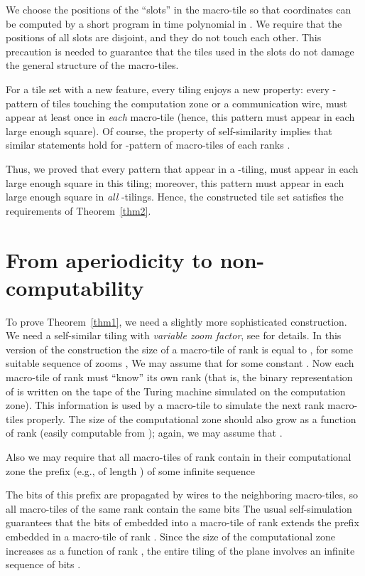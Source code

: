 \documentclass[runningheads]{llncs}
\begin{document}
We choose the positions of the ``slots'' in the macro-tile so that coordinates can be computed by a short program in time polynomial in . We require that the positions of all slots are disjoint, and they do not touch each other. This precaution is needed to guarantee that the tiles used in the slots do not damage the general structure of the macro-tiles.

For a tile set with a new feature, every tiling enjoys a new property: every -pattern of tiles touching the computation zone or a communication wire, must appear at least once in \emph{each} macro-tile (hence, this pattern must appear in each large enough square). Of course, the property of self-similarity implies that similar statements hold for  -pattern of macro-tiles of each ranks . 


Thus, we proved that every  pattern that appear in a -tiling, must appear in each large enough square in this tiling; moreover,  this pattern must appear in each large enough square in \emph{all} -tilings. Hence, the constructed tile set satisfies the requirements of Theorem~\ref{thm2}. 

\section{From aperiodicity to non-computability}

To prove Theorem~\ref{thm1}, we need a slightly more sophisticated construction. We need a self-similar tiling with \emph{variable zoom factor}, see
 \cite{drs} for details. In this version of the construction the size of a macro-tile of rank  is equal to , for some suitable sequence of zooms ,  We may assume that  for some constant .   Now each macro-tile of rank  must ``know'' its own rank (that is, the binary representation of  is written on the tape of the Turing machine simulated on the computation zone). This information is used by a macro-tile to simulate the next rank macro-tiles properly.  The size of the computational zone  should also grow as a  function of rank  (easily computable from ); again, we may assume that .

Also we may require that all macro-tiles of rank  contain in their computational zone the prefix (e.g., of length ) of some infinite sequence
 
The bits of this prefix are propagated by wires to the neighboring macro-tiles, so all macro-tiles of the same rank contain the same bits   The usual self-simulation guarantees that the bits of  embedded into a macro-tile of rank  extends the prefix embedded in a macro-tile of rank . Since the size of the computational zone increases as a function of rank , the entire tiling of the plane involves an infinite sequence of bits .
\end{document}
